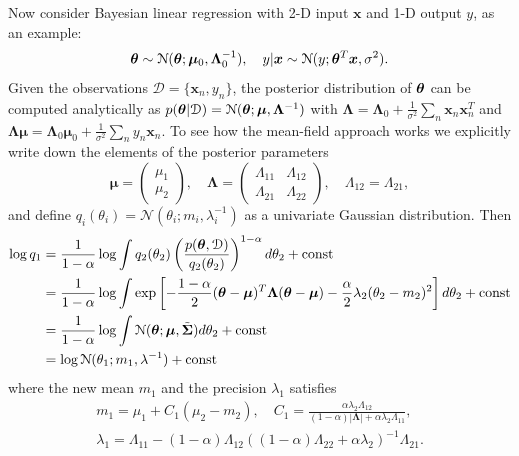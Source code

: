 Now consider Bayesian linear regression with 2-D input $\bm{x}$ and 1-D output $y$, as an example:
\begin{equation*}
\bm{\theta} \sim \mathcal{N}(\bm{\theta}; \bm{\mu}_0, \bm{\Lambda}_0^{-1}), \quad 
y|\bm{x} \sim \mathcal{N}(y; \bm{\theta}^T \bm{x}, \sigma^2).
\end{equation*}
Given the observations $\mathcal{D} = \{\bm{x}_n, y_n \}$, the posterior distribution of $\bm{\theta}$ can be computed analytically as $p(\bm{\theta}|\mathcal{D}) = \mathcal{N}(\bm{\theta}; \bm{\mu}, \bm{\Lambda}^{-1})$ with $\bm{\Lambda} = \bm{\Lambda}_0 + \frac{1}{\sigma^2} \sum_n \bm{x}_n \bm{x}_n^T$ and $\bm{\Lambda} \bm{\mu} = \bm{\Lambda}_0 \bm{\mu}_0 + \frac{1}{\sigma^2} \sum_n y_n \bm{x}_n$. To see how the mean-field approach works we explicitly write down the elements of the posterior parameters
\begin{equation*}
\bm{\mu} = \begin{pmatrix} \mu_1 \\ \mu_2 \end{pmatrix}, \quad
\bm{\Lambda} = \begin{pmatrix} \Lambda_{11} & \Lambda_{12} \\ \Lambda_{21} & \Lambda_{22} \end{pmatrix}, 
\quad \Lambda_{12} = \Lambda_{21},
\end{equation*}
and define $q_i(\theta_i) = \mathcal{N}(\theta_i; m_i, \lambda_i^{-1})$ as a univariate Gaussian distribution. Then
\begin{equation*}
\begin{aligned}
\log q_1 &= \frac{1}{1 - \alpha} \log \int q_2(\theta_2)  \left( \frac{p(\bm{\theta}, \mathcal{D})}{q_2(\theta_2)} \right)^{1 - \alpha} d\theta_2 + \text{const} \\
&= \frac{1}{1 - \alpha} \log \int \exp \left[ -\frac{1 - \alpha}{2} (\bm{\theta} - \bm{\mu})^T \bm{\Lambda} (\bm{\theta} - \bm{\mu}) - \frac{\alpha}{2} \lambda_2 (\theta_2 - m_2)^2 \right] d\theta_2 + \text{const} \\
&= \frac{1}{1 - \alpha} \log \int \mathcal{N}(\bm{\theta}; \bm{\mu}, \tilde{\bm{\Sigma}}) d\theta_2 + \text{const} \\
&= \log \mathcal{N}(\theta_1; m_1, \lambda^{-1}) + \text{const}
\end{aligned}
\end{equation*}
where the new mean $m_1$ and the precision $\lambda_1$ satisfies
\begin{equation*}
\begin{aligned}
m_1 = \mu_1 + C_1(\mu_2 - m_2), \quad C_1 = \frac{\alpha \lambda_2 \Lambda_{12}}{(1 - \alpha) |\bm{\Lambda}| + \alpha \lambda_2 \Lambda_{11}}, \\
\lambda_1 = \Lambda_{11} - (1 - \alpha) \Lambda_{12} ((1 - \alpha) \Lambda_{22} + \alpha \lambda_2)^{-1} \Lambda_{21}.
\end{aligned}
\end{equation*}
